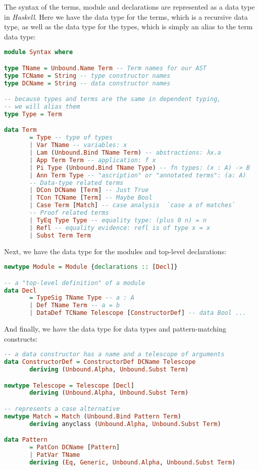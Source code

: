\documentclass[12pt]{article}
\theoremstyle{definition}
\begin{document}
The syntax of the terms, module and declarations are represented as a data type in \emph{Haskell}.
Here we have the data type for the terms, which is a recursive data type, as well as the data type for the types, which is simply an alias to the term data type:

\begin{lstlisting}[language=Haskell]
module Syntax where

type TName = Unbound.Name Term -- Term names for our AST
type TCName = String -- type constructor names
type DCName = String -- data constructor names

-- because types and terms are the same in dependent typing,
-- we will alias them
type Type = Term

data Term
       = Type -- type of types
       | Var TName -- variables: x
       | Lam (Unbound.Bind TName Term) -- abstractions: λx.a
       | App Term Term -- application: f x
       | Pi Type (Unbound.Bind TName Type) -- fn types: (x : A) -> B
       | Ann Term Type -- "ascription" or "annotated terms": (a: A)
       -- Data-type related terms
       | DCon DCName [Term] -- Just True
       | TCon TCName [Term] -- Maybe Bool
       | Case Term [Match] -- case analysis  `case a of matches`
       -- Proof related terms
       | TyEq Type Type -- equality type: (plus 0 n) = n
       | Refl -- equality evidence: refl is of type x = x
       | Subst Term Term
\end{lstlisting}
Next, we have the data type for the modules and top-level declarations:
\begin{lstlisting}[language=Haskell]
newtype Module = Module {declarations :: [Decl]}

-- a "top-level definition" of a module
data Decl
       = TypeSig TName Type -- a : A
       | Def TName Term -- a = b
       | DataDef TCName Telescope [ConstructorDef] -- data Bool ...
\end{lstlisting}
And finally, we have the data type for data types and pattern-matching constructs:
\begin{lstlisting}[language=Haskell]
-- a data constructor has a name and a telescope of arguments
data ConstructorDef = ConstructorDef DCName Telescope
       deriving (Unbound.Alpha, Unbound.Subst Term)

newtype Telescope = Telescope [Decl]
       deriving (Unbound.Alpha, Unbound.Subst Term)

-- represents a case alternative
newtype Match = Match (Unbound.Bind Pattern Term)
       deriving anyclass (Unbound.Alpha, Unbound.Subst Term)

data Pattern
       = PatCon DCName [Pattern]
       | PatVar TName
       deriving (Eq, Generic, Unbound.Alpha, Unbound.Subst Term)
\end{lstlisting}
\end{document}
